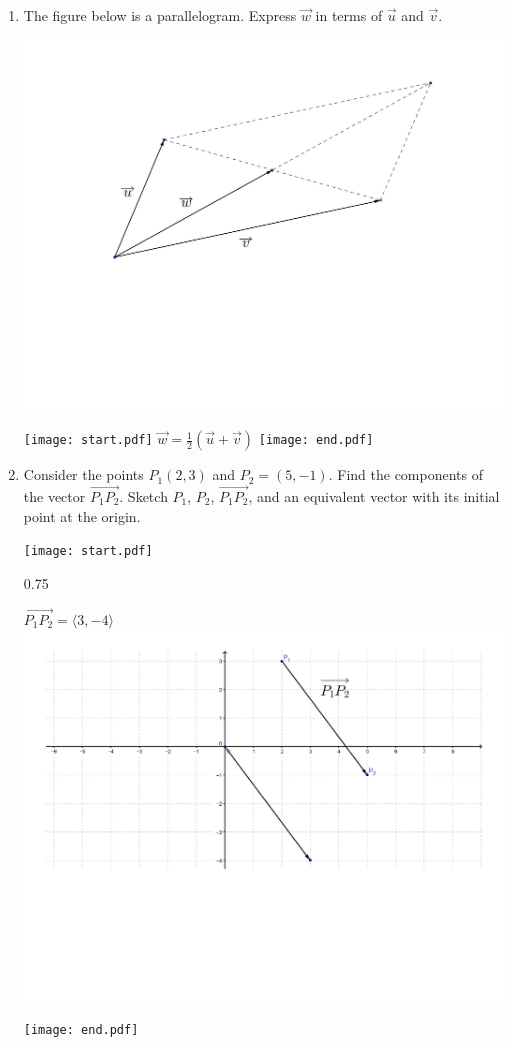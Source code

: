 \documentclass[12pt]{article}
\begin{document}
\begin{enumerate}
\item The figure below is a parallelogram.  Express $\overrightarrow{w}$ in terms of $\overrightarrow{u}$ and $\overrightarrow{v}$.

\begin{center}
\includegraphics[scale=0.4]{vector3.pdf}
\end{center}

\texttt{[image: start.pdf]}
{{$\overrightarrow{w}=\frac{1}{2}\left(\overrightarrow{u}+\overrightarrow{v}\right)$}}
\texttt{[image: end.pdf]}


\item Consider the points $P_1(2,3)$ and $P_2=(5,-1)$. Find the components of the vector $\overrightarrow{P_1P_2}$.  Sketch $P_1$, $P_2$, $\overrightarrow{P_1P_2}$, and an equivalent vector with its initial point at the origin.

\texttt{[image: start.pdf]}
{{{0.75\linewidth}{\begin{center}$\overrightarrow{P_1P_2}=\langle 3,-4 \rangle$\\
\includegraphics[scale=0.3]{vector4.pdf}\end{center} }}}
\texttt{[image: end.pdf]}



\end{enumerate}
\end{document}
